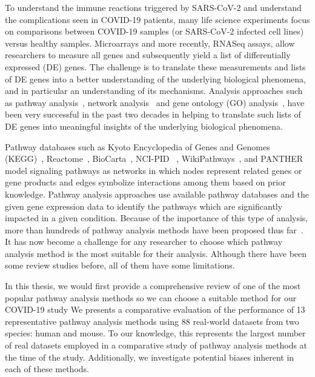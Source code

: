 To understand the immune reactions triggered by SARS-CoV-2 and understand the complications seen in COVID-19 patients, many life science experiments focus on comparisons between COVID-19 samples (or SARS-CoV-2 infected cell lines) versus healthy samples.
Microarrays and more recently, RNASeq assays, allow researchers to measure all genes and subsequently  yield a list of differentially expressed (DE) genes.
The challenge is to translate these measurements and lists of DE genes into a better understanding of the underlying biological phenomena, and in particular an understanding of its mechanisms. Analysis approaches such as pathway analysis~\cite{DraghiciOntologicalToolsReview:2005,Khatri:2012, mitrea2013methods, tarca2013comparison, nguyen2018network, ihnatova2018critical, nguyen2019identifying}, network analysis~\cite{mitra2013integrative} and gene ontology (GO) analysis~\cite{DraghiciOntologicalToolsReview:2005,Rhee:2008}, have been very successful in the past two decades in helping to translate such lists of DE genes into meaningful insights of the underlying biological phenomena. 

Pathway databases such as Kyoto Encyclopedia of Genes and Genomes (KEGG)~\cite{Kanehisa:2000}, Reactome~\cite{croft2014reactome}, BioCarta~\cite{BioCartaWWW}, NCI-PID ~\cite{Schaefer:2009}, WikiPathways~\cite{pico2008wikipathways}, and PANTHER~\cite{thomas2003panther} model signaling pathways as networks in which nodes represent related genes or gene products and edges symbolize interactions among them based on prior knowledge. 
Pathway analysis approaches use available pathway databases and the given gene expression data to identify the pathways which are significantly impacted in a given condition. 
Because of the importance of this type of analysis, more than hundreds of pathway analysis methods have been proposed thus far~\cite{DraghiciOntologicalToolsReview:2005,Khatri:2002,mitrea2013methods}.
It has now become a challenge for any researcher to choose which pathway analysis method is the most suitable for their analysis. 
Although there have been some review studies before, all of them have some limitations.

In this thesis, we would first provide a comprehensive review of one of the most popular pathway analysis methods so we can choose a suitable method for our COVID-19 study
We presents a comparative evaluation of the performance of 13 representative pathway analysis methods using 88 real-world datasets from two species: human and mouse. To our knowledge, this represents the largest number of real datasets employed in a comparative study of pathway analysis methods at the time of the study. Additionally, we investigate potential biases inherent in each of these methods.

